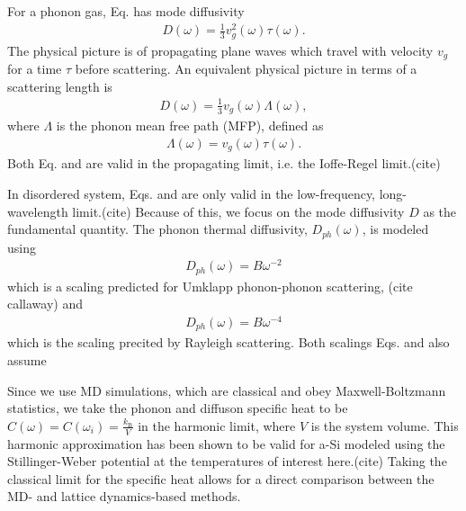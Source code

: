\documentclass[aps,prb,twocolumn,superscriptaddress,footinbib,amsmath,amssymb,floatfix]{revtex4}
\begin{document}
For a phonon gas, Eq. has mode diffusivity   
\begin{equation}\label{EQ:Dtau}
\begin{split}
D(\omega) = \frac{1}{3}v^2_g(\omega)\tau(\omega).
\end{split}
\end{equation}
The physical picture is of propagating plane waves which 
travel with velocity $v_g$ for a time $\tau$ before scattering. 
An equivalent physical picture in terms of a scattering length 
is
\begin{equation}\label{EQ:DLambda}
\begin{split}
D(\omega) = \frac{1}{3}v_g(\omega) \Lambda(\omega),
\end{split}
\end{equation}
where $\Lambda$ is the phonon mean free path (MFP), defined as 
\begin{equation}\label{EQ:Lambda}
\begin{split}
\Lambda(\omega) = v_{g}(\omega) \tau(\omega).
\end{split}
\end{equation}
Both Eq. and are valid in the propagating 
limit, i.e. the Ioffe-Regel limit.(cite)

In disordered system, Eqs. and  are only valid in the 
low-frequency, long-wavelength limit.(cite) 
Because of this, we focus on the mode 
diffusivity $D$ as the fundamental quantity. 
The phonon thermal diffusivity, $D_{ph}(\omega)$, is modeled using 
\begin{equation}\label{EQ:Dw2}
\begin{split}
D_{ph}(\omega) = B\omega^{-2} 
\end{split}
\end{equation}
which is a scaling predicted for Umklapp phonon-phonon scattering,
(cite callaway) and
\begin{equation}\label{EQ:Dw4}
\begin{split}
D_{ph}(\omega) = B\omega^{-4} 
\end{split}
\end{equation}
which is the scaling precited by Rayleigh scattering.
\cite{klemens_scattering_1955} Both scalings Eqs. and also assume 

Since we use MD simulations, which are classical 
and obey Maxwell-Boltzmann 
statistics,\cite{mcquarrie_statistical_2000} we take the phonon and diffuson 
specific heat to be $C(\omega) = C(\omega_i) = \frac{k_{\text{B}}}{V}$ in the 
harmonic limit, where $V$ 
is the system volume. This harmonic approximation has been shown to be valid 
for a-Si modeled using the Stillinger-Weber potential at the temperatures of 
interest here.(cite)  
Taking the classical limit for the specific heat allows for a direct 
comparison between 
the MD- and lattice dynamics-based methods. 
\end{document}
